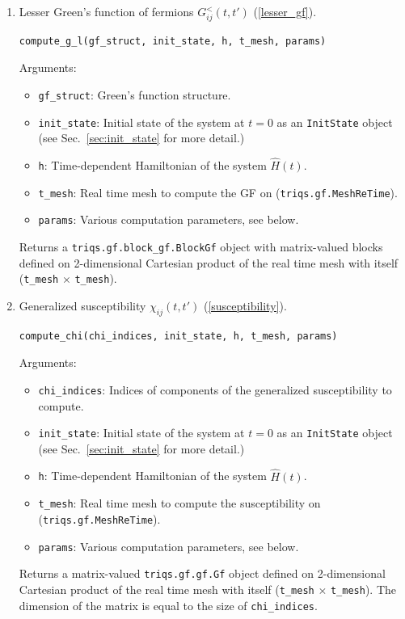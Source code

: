\documentclass[]{article}
\begin{document}
\begin{enumerate}
    \item Lesser Green's function of fermions $G^<_{ij}(t,t')$ (\ref{lesser_gf}).
    \begin{lstlisting}[language=Python]
        compute_g_l(gf_struct, init_state, h, t_mesh, params)
    \end{lstlisting}
    Arguments:
    \begin{itemize}
        \item \texttt{gf\_struct}: Green's function structure.
        \item \texttt{init\_state}: Initial state of the system at $t=0$ as an \texttt{InitState} object (see Sec.~\ref{sec:init_state} for more detail.)
        \item \texttt{h}: Time-dependent Hamiltonian of the system $\hat H(t)$.
        \item \texttt{t\_mesh}: Real time mesh to compute the GF on (\texttt{triqs.gf.MeshReTime}).
        \item \texttt{params}: Various computation parameters, see below.
    \end{itemize}
    Returns a \texttt{triqs.gf.block\_gf.BlockGf} object with matrix-valued blocks defined on 2-dimensional Cartesian product of the real time mesh with itself (\texttt{t\_mesh} $\times$ \texttt{t\_mesh}).

    \item Generalized susceptibility $\chi_{ij}(t,t')$ (\ref{susceptibility}).
    \begin{lstlisting}[language=Python]
        compute_chi(chi_indices, init_state, h, t_mesh, params)
    \end{lstlisting}
    Arguments:
    \begin{itemize}
        \item \texttt{chi\_indices}: Indices of components of the generalized susceptibility to compute.
        \item \texttt{init\_state}: Initial state of the system at $t=0$ as an \texttt{InitState} object (see Sec.~\ref{sec:init_state} for more detail.)
        \item \texttt{h}: Time-dependent Hamiltonian of the system $\hat H(t)$.
        \item \texttt{t\_mesh}: Real time mesh to compute the susceptibility on (\texttt{triqs.gf.MeshReTime}).
        \item \texttt{params}: Various computation parameters, see below.
    \end{itemize}
    Returns a matrix-valued \texttt{triqs.gf.gf.Gf} object defined on 2-dimensional Cartesian product of the real time mesh with itself (\texttt{t\_mesh} $\times$ \texttt{t\_mesh}). The dimension of the matrix is equal to the size of \texttt{chi\_indices}.

\end{enumerate}
\end{document}
